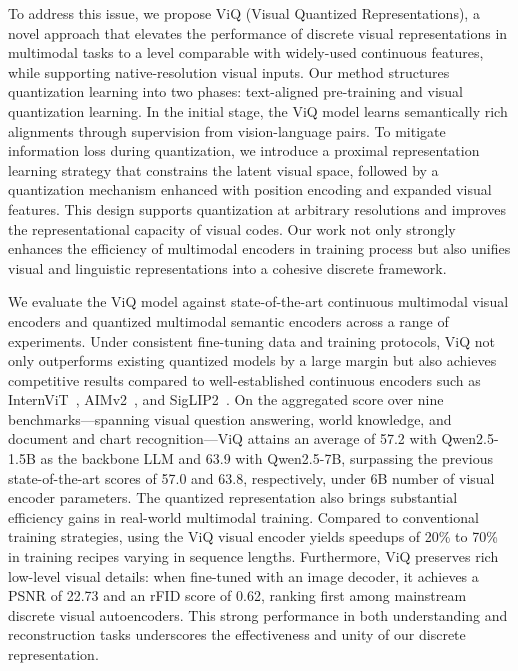 \documentclass{llmxive}
\begin{document}
To address this issue, we propose ViQ (Visual Quantized Representations), a novel approach that elevates the performance of discrete visual representations in multimodal tasks to a level comparable with widely-used continuous features, while supporting native-resolution visual inputs. Our method structures quantization learning into two phases: text-aligned pre-training and visual quantization learning. In the initial stage, the ViQ model learns semantically rich alignments through supervision from vision-language pairs. To mitigate information loss during quantization, we introduce a proximal representation learning strategy that constrains the latent visual space, followed by a quantization mechanism enhanced with position encoding and expanded visual features. This design supports quantization at arbitrary resolutions and improves the representational capacity of visual codes. Our work not only strongly enhances the efficiency of multimodal encoders in training process but also unifies visual and linguistic representations into a cohesive discrete framework.

We evaluate the ViQ model against state-of-the-art continuous multimodal visual encoders and quantized multimodal semantic encoders across a range of experiments. Under consistent fine-tuning data and training protocols, ViQ not only outperforms existing quantized models by a large margin but also achieves competitive results compared to well-established continuous encoders such as InternViT~\cite{zhu2025internvl3}, AIMv2~\cite{fini2025multimodal}, and SigLIP2~\cite{tschannen2025siglip}. On the aggregated score over nine benchmarks—spanning visual question answering, world knowledge, and document and chart recognition—ViQ attains an average of 57.2 with Qwen2.5-1.5B as the backbone LLM and 63.9 with Qwen2.5-7B, surpassing the previous state-of-the-art scores of 57.0 and 63.8, respectively, under 6B number of visual encoder parameters. The quantized representation also brings substantial efficiency gains in real-world multimodal training. Compared to conventional training strategies, using the ViQ visual encoder yields speedups of 20\% to 70\% in training recipes varying in sequence lengths. Furthermore, ViQ preserves rich low-level visual details: when fine-tuned with an image decoder, it achieves a PSNR of 22.73 and an rFID score of 0.62, ranking first among mainstream discrete visual autoencoders. This strong performance in both understanding and reconstruction tasks underscores the effectiveness and unity of our discrete representation.
\end{document}
